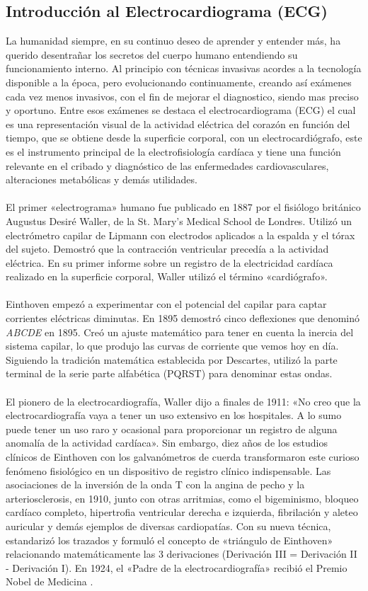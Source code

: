 \documentclass[12pt,letterpaper,oneside,openright]{book}
\begin{document}
\subsection{Introducción al Electrocardiograma (ECG)}
	La humanidad siempre, en su continuo deseo de aprender y entender más, ha querido desentrañar los secretos del cuerpo humano entendiendo su funcionamiento interno. Al principio con técnicas invasivas acordes a la tecnología disponible a la época, pero evolucionando continuamente, creando así exámenes cada vez menos invasivos, con el fin de mejorar el diagnostico, siendo mas preciso y oportuno. Entre esos exámenes se destaca el electrocardiograma (ECG) el cual es una representación visual de la actividad eléctrica del corazón en función del tiempo, que se obtiene desde la superficie corporal, con un electrocardiógrafo, este es el instrumento principal de la electrofisiología cardíaca y tiene una función relevante en el cribado y diagnóstico de las enfermedades cardiovasculares, alteraciones metabólicas y demás utilidades. \\
	\\
    El primer «electrograma» humano fue publicado en 1887 por el fisiólogo británico Augustus Desiré Waller, de la St. Mary's Medical School de Londres. Utilizó un electrómetro capilar de Lipmann con electrodos aplicados a la espalda y el tórax del sujeto. Demostró que la contracción ventricular precedía a la actividad eléctrica. En su primer informe sobre un registro de la electricidad cardíaca realizado en la superficie corporal, Waller utilizó el término «cardiógrafo».  \\
    \\
    Einthoven empezó a experimentar con el potencial del capilar para captar corrientes eléctricas diminutas. En 1895 demostró cinco deflexiones que denominó \textit{ABCDE} en 1895. Creó un ajuste matemático para tener en cuenta la inercia del sistema capilar, lo que produjo las curvas de corriente que vemos hoy en día. Siguiendo la tradición matemática establecida por Descartes, utilizó la parte terminal de la serie parte alfabética (PQRST) para denominar estas ondas. \\
    \\
    El pionero de la electrocardiografía, Waller dijo a finales de 1911: «No creo que la electrocardiografía vaya a tener un uso extensivo en los hospitales. A lo sumo puede tener un uso raro y ocasional para proporcionar un registro de alguna anomalía de la actividad cardíaca». Sin embargo, diez años de los estudios clínicos de Einthoven con los galvanómetros de cuerda transformaron este curioso fenómeno fisiológico en un dispositivo de registro clínico indispensable. Las asociaciones de la inversión de la onda T con la angina de pecho y la arteriosclerosis, en 1910, junto con otras arritmias, como el bigeminismo, bloqueo cardíaco completo, hipertrofia ventricular derecha e izquierda, fibrilación y aleteo auricular y demás ejemplos de diversas cardiopatías. Con su nueva técnica, estandarizó los trazados y formuló el concepto de «triángulo de Einthoven» relacionando matemáticamente las 3 derivaciones (Derivación III = Derivación II - Derivación I). En 1924, el «Padre de la electrocardiografía» recibió el Premio Nobel de Medicina \cite{vincent2022}.\\
\end{document}
